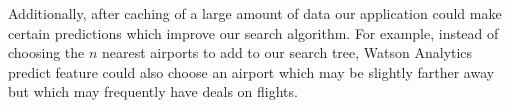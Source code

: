 \documentclass[11pt]{article}
\begin{document}
Additionally, after caching of a large amount of data our application could make certain predictions which improve our search algorithm.  For example, instead of choosing the $n$ nearest airports to add to our search tree, Watson Analytics predict feature could also choose an airport which may be slightly farther away but which may frequently have deals on flights.
				
\end{document}

